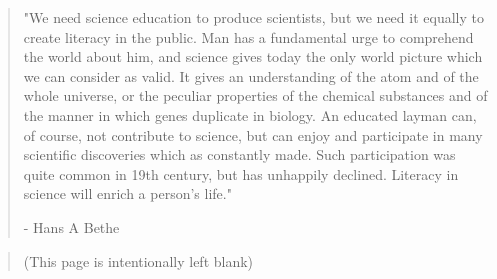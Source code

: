\newpage
\thispagestyle{empty}
\mbox{}
\vspace*{\fill} 
\begin{quote} 
\centering 
"We need science education to produce scientists, but we need it equally to create literacy in the public. Man has a fundamental urge to comprehend the world about him, and science gives today the only world picture which we can consider as valid. It gives an understanding of the atom and of the whole universe, or the peculiar properties of the chemical substances and of the manner in which genes duplicate in biology. An educated layman can, of course, not contribute to science, but can enjoy and participate in many scientific discoveries which as constantly made. Such participation was quite common in 19th century, but has unhappily declined. Literacy in science will enrich a person's life."

- Hans A Bethe
\end{quote}
\vspace*{\fill}
\newpage
\thispagestyle{empty}
\mbox{}
\vspace*{\fill} 
    \begin{quote} 
    \centering 
    (This page is intentionally left blank)
    \end{quote}
\vspace*{\fill}
\setcounter{page}{0}